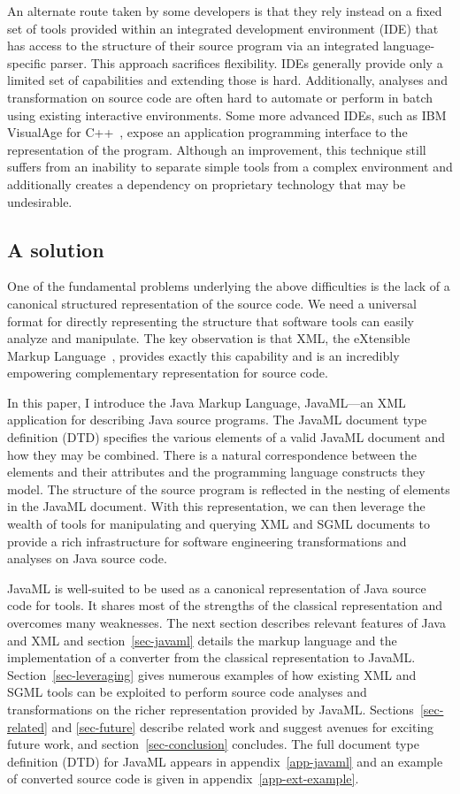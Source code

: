 \documentclass{article}
\begin{document}
An alternate route taken by some developers is that they rely instead on
a fixed set of tools provided within an integrated development
environment (IDE) that has access to the structure of their source
program via an integrated language-specific parser.  This approach
sacrifices flexibility.  IDEs generally provide only a limited set of
capabilities and extending those is hard.  Additionally, analyses and
transformation on source code are often hard to automate or perform in
batch using existing interactive environments.  Some more advanced IDEs,
such as IBM VisualAge for C++~\cite{Montana}, expose an application
programming interface to the representation of the program.  Although an
improvement, this technique still suffers from an inability to separate
simple tools from a complex environment and additionally creates a
dependency on proprietary technology that may be undesirable.

\subsection{A solution}

One of the fundamental problems underlying the above difficulties is the
lack of a canonical structured representation of the source code.  We
need a universal format for directly representing the structure that
software tools can easily analyze and manipulate.  The key observation
is that XML, the eXtensible Markup Language~\cite{XML}, provides exactly
this capability and is an incredibly empowering complementary
representation for source code.

In this paper, I introduce the Java Markup Language, JavaML---an XML
application for describing Java source programs.  The JavaML document
type definition (DTD) specifies the various elements of a valid JavaML
document and how they may be combined.  There is a natural
correspondence between the elements and their attributes and the
programming language constructs they model.  The structure of the source
program is reflected in the nesting of elements in the JavaML document.
With this representation, we can then leverage the wealth of tools for
manipulating and querying XML and SGML documents to provide a rich
infrastructure for software engineering transformations and analyses on
Java source code.

JavaML is well-suited to be used as a canonical representation of Java
source code for tools.  It shares most of the strengths of the classical
representation and overcomes many weaknesses.  The next section
describes relevant features of Java and XML and section~\ref{sec-javaml}
details the markup language and the implementation of a converter from
the classical representation to JavaML.  Section~\ref{sec-leveraging}
gives numerous examples of how existing XML and SGML tools can be
exploited to perform source code analyses and transformations on the
richer representation provided by JavaML.  Sections~\ref{sec-related}
and \ref{sec-future} describe related work and suggest avenues for
exciting future work, and section~\ref{sec-conclusion} concludes.  The
full document type definition (DTD) for JavaML appears in
appendix~\ref{app-javaml} and an example of converted source code is
given in appendix~\ref{app-ext-example}.
\end{document}
